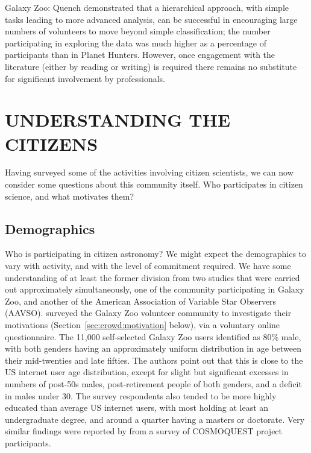 \documentclass{ar2e}
\def\Sref#1{Section~\ref{#1}\xspace}
\def\CaseStudy#1{\noindent{\it\bf #1 \,\,\,\,}}
\begin{document}

Galaxy Zoo: Quench demonstrated that a hierarchical approach, with simple tasks leading to
more advanced analysis, can be successful in encouraging large numbers of
volunteers to move beyond simple classification; the number participating in
exploring the data was much higher as a percentage of participants than in
Planet Hunters. However, once engagement with the literature (either by reading
or writing) is required there remains no substitute for significant involvement
by professionals. 



% 




\section{UNDERSTANDING THE CITIZENS}
\label{sec:crowd}

Having surveyed some of the activities involving citizen scientists, we can
now consider some questions about this community itself. Who participates in
citizen science, and what motivates them?



\subsection{Demographics}
\label{sec:crowd:demographics}

Who is participating in citizen astronomy? We might expect the demographics to
vary with activity, and with the level of commitment required. We have some
understanding of at least the former division from two studies that were
carried out approximately simultaneously, one of the community  participating
in Galaxy Zoo, and another of the American Association of Variable Star
Observers (AAVSO).  \citet{Rad++2013} surveyed the Galaxy Zoo volunteer
community to investigate their motivations (\Sref{sec:crowd:motivation}
below), via a voluntary online questionnaire. The 11,000 self-selected Galaxy
Zoo users identified as 80\% male, with both genders having an approximately
uniform distribution in age between their mid-twenties and late fifties. The
authors point out that this is close to the US internet user age distribution,
except for slight but significant excesses in numbers of post-50s males,
post-retirement people of both genders, and a deficit in males under 30. The
survey respondents  also tended to be more highly educated than average US
internet users, with most holding at least an undergraduate degree, and around
a quarter having a masters or doctorate. Very similar findings were reported
by \citet{COSMOQUESTsurvey} from a survey of COSMOQUEST project participants.
\end{document}
